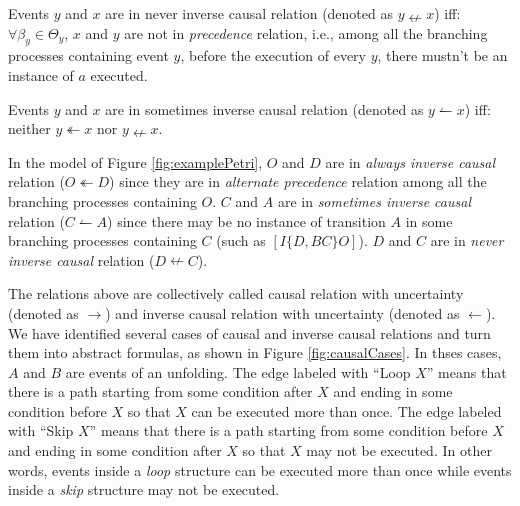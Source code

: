 \documentclass[dvips,...]{llncs}
\begin{document}
\begin{definition}\label{def:neverInverseCausal}
Events $y$ and $x$ are in never inverse causal relation (denoted as $y\nleftarrow x$) iff: $\forall\beta_{y}\in\Theta_{y}$, $x$ and $y$ are not in \textit{precedence} relation, i.e., among all the branching processes containing event $y$, before the execution of every $y$, there mustn't be an instance of $a$ executed.
\end{definition}

\begin{definition}\label{def:sometimesInverseCausal}
Events $y$ and $x$ are in sometimes inverse causal relation (denoted as $y\leftharpoonup x$) iff: neither $y\twoheadleftarrow x$ nor $y\nleftarrow x$.
\end{definition}

\begin{example}
In the model of Figure \ref{fig:examplePetri}, $O$ and $D$ are in \textit{always inverse causal} relation ($O\twoheadleftarrow D$) since they are in \textit{alternate precedence} relation among all the branching processes containing $O$. $C$ and $A$ are in \textit{sometimes inverse causal} relation ($C\leftharpoonup A$) since there may be no instance of transition $A$ in some branching processes containing $C$ (such as $[I\{D,BC\}O]$). $D$ and $C$ are in \textit{never inverse causal} relation ($D\nleftarrow C$).
\end{example}

The relations above are collectively called causal relation with uncertainty (denoted as $\rightarrow$) and inverse causal relation with uncertainty (denoted as $\leftarrow $). We have identified several cases of causal and inverse causal relations and turn them into abstract formulas, as shown in Figure \ref{fig:causalCases}. In thses cases, $A$ and $B$ are events of an unfolding. The edge labeled with ``Loop $X$'' means that there is a path starting from some condition after $X$ and ending in some condition before $X$ so that $X$ can be executed more than once. The edge labeled with ``Skip $X$'' means that there is a path starting from some condition before $X$ and ending in some condition after $X$ so that $X$ may not be executed. In other words, events inside a \textit{loop} structure can be executed more than once while events inside a \textit{skip} structure may not be executed.
\end{document}
